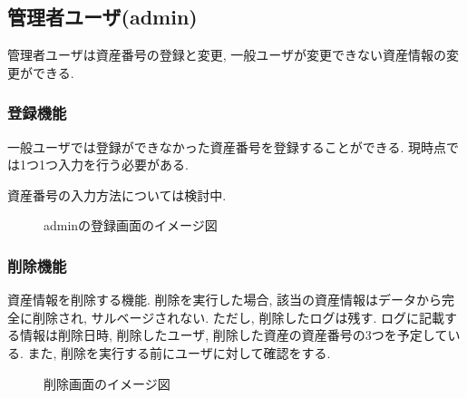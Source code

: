 \documentclass[11ptm]{jsarticle}
\begin{document}
\clearpage
\subsection{管理者ユーザ(admin)}
\label{subsec:管理者ユーザ(admin)}
管理者ユーザは資産番号の登録と変更, 一般ユーザが変更できない資産情報の変更ができる.

\subsubsection{登録機能}
\label{subsubsec:登録機能}
一般ユーザでは登録ができなかった資産番号を登録することができる. 現時点では1つ1つ入力を行う必要がある. \par
資産番号の入力方法については検討中. 
\begin{figure}[h]
  \centering
  \caption{\label{fig:adminの登録画面のイメージ図}adminの登録画面のイメージ図}
\end{figure}\par

\clearpage
\subsubsection{削除機能}
\label{subsec:削除機能}
資産情報を削除する機能. 削除を実行した場合, 該当の資産情報はデータから完全に削除され, サルベージされない. ただし, 削除したログは残す. ログに記載する情報は削除日時, 削除したユーザ, 削除した資産の資産番号の3つを予定している. また, 削除を実行する前にユーザに対して確認をする.
\begin{figure}[h]
  \centering
  \caption{\label{fig:削除画面のイメージ図}削除画面のイメージ図}
\end{figure}\par
\end{document}
